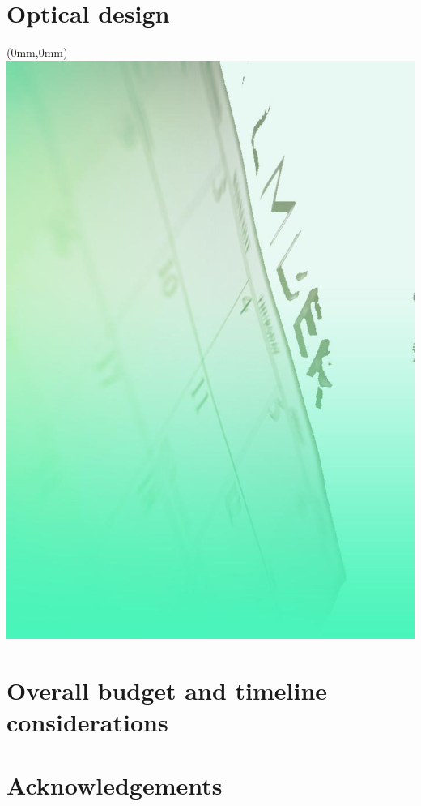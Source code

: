 \documentclass[color,DIV12,pdftex,a4paper]{ET-DS}
\begin{document}
\section{Optical design}

%
%
%
\cleardoublepage 
\FloatBarrier
\begin{textblock*}{297mm}(0mm,0mm)   \includegraphics[width=\paperwidth]{Sec_Conclusions/ConclusionBackgroundImage.jpg}
\end{textblock*}
%
%
\section{Overall budget and timeline considerations}


\cleardoublepage
\FloatBarrier

%
\FloatBarrier
\section{Acknowledgements}
\label{Acknowledgements}

%
\end{document}
